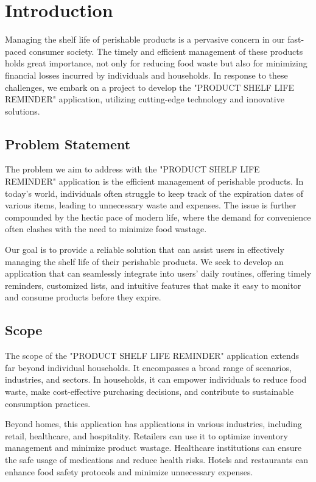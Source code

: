 

\chapter{Introduction}\doublespacing

Managing the shelf life of perishable products is a pervasive concern in our fast-paced consumer society. The timely and efficient management of these products holds great importance, not only for reducing food waste but also for minimizing financial losses incurred by individuals and households. In response to these challenges, we embark on a project to develop the "PRODUCT SHELF LIFE REMINDER" application, utilizing cutting-edge technology and innovative solutions.

\section{Problem Statement}

The problem we aim to address with the "PRODUCT SHELF LIFE REMINDER" application is the efficient management of perishable products. In today's world, individuals often struggle to keep track of the expiration dates of various items, leading to unnecessary waste and expenses. The issue is further compounded by the hectic pace of modern life, where the demand for convenience often clashes with the need to minimize food wastage.

Our goal is to provide a reliable solution that can assist users in effectively managing the shelf life of their perishable products. We seek to develop an application that can seamlessly integrate into users' daily routines, offering timely reminders, customized lists, and intuitive features that make it easy to monitor and consume products before they expire.

\section{Scope}

The scope of the "PRODUCT SHELF LIFE REMINDER" application extends far beyond individual households. It encompasses a broad range of scenarios, industries, and sectors. In households, it can empower individuals to reduce food waste, make cost-effective purchasing decisions, and contribute to sustainable consumption practices.

Beyond homes, this application has applications in various industries, including retail, healthcare, and hospitality. Retailers can use it to optimize inventory management and minimize product wastage. Healthcare institutions can ensure the safe usage of medications and reduce health risks. Hotels and restaurants can enhance food safety protocols and minimize unnecessary expenses.

